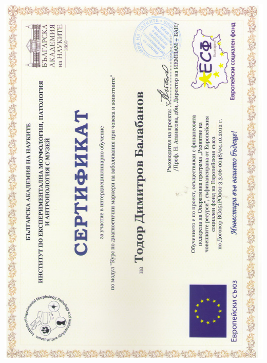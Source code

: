 \documentclass[english,a4paper]{europasscv}
\begin{document}
\includegraphics[width=\textwidth,height=\textheight,keepaspectratio]{IEMPAM2014_2}
\end{document}
